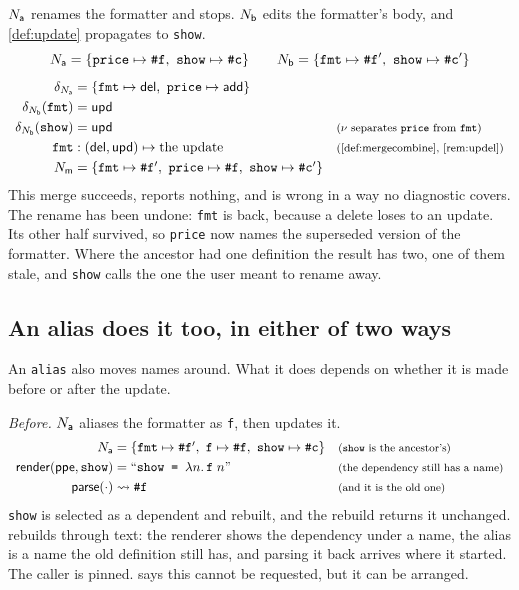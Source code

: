\documentclass[11pt]{article}
\theoremstyle{definition}
\theoremstyle{plain}
\theoremstyle{remark}
\begin{document}
$N_{\mathsf{a}}$ renames the formatter and stops. $N_{\mathsf{b}}$ edits the formatter's body, and \cref{def:update}
propagates to \texttt{show}.
\[
  N_{\mathsf{a}} = \{\texttt{price} \mapsto \texttt{\#f},\ \texttt{show} \mapsto \texttt{\#c}\}
  \qquad
  N_{\mathsf{b}} = \{\texttt{fmt} \mapsto \texttt{\#f}',\ \texttt{show} \mapsto \texttt{\#c}'\}
\]
\[
\begin{array}{r@{\;}l@{\quad}l}
  \delta_{\NA} &= \{\texttt{fmt} \mapsto \ddel,\ \texttt{price} \mapsto \dadd\} & \\[3pt]
  \delta_{\NB}(\texttt{fmt}) &= \dupd & \\[3pt]
  \delta_{\NB}(\texttt{show}) &= \dupd
    & \just{$\namer$ separates \texttt{price} from \texttt{fmt}} \\[3pt]
  \texttt{fmt} &: (\ddel, \dupd) \mapsto \text{the update}
    & \just{\cref{def:mergecombine}, \cref{rem:updel}} \\[3pt]
  \NM &= \{\texttt{fmt} \mapsto \texttt{\#f}',\
            \texttt{price} \mapsto \texttt{\#f},\
            \texttt{show} \mapsto \texttt{\#c}'\} &
\end{array}
\]
This merge succeeds, reports nothing, and is wrong in a way no diagnostic covers. The rename has been
undone: \texttt{fmt} is back, because a delete loses to an update. Its other half survived, so
\texttt{price} now names the superseded version of the formatter. Where the ancestor had one
definition the result has two, one of them stale, and \texttt{show} calls the one the user meant to
rename away.

\subsection{An alias does it too, in either of two ways}\label{ex:merge-alias}

An \texttt{alias} also moves names around. What it does depends on whether it is made before or after
the update.

\emph{Before.} $N_{\mathsf{a}}$ aliases the formatter as \texttt{f}, then updates it.
\[
\begin{array}{r@{\;}l@{\quad}l}
  \NA &= \{\texttt{fmt} \mapsto \texttt{\#f}',\ \texttt{f} \mapsto \texttt{\#f},\
            \texttt{show} \mapsto \texttt{\#c}\}
    & \just{\texttt{show} is the ancestor's} \\[3pt]
  \render(\ppe, \texttt{show}) &= ``\texttt{show = }\ulam{n}{\uapp{\uvar{\texttt{f}}}{\uvar n}}\text{''}
    & \just{the dependency still has a name} \\[3pt]
  \uparse(\cdot) &\rightsquigarrow \uref{\texttt{\#f}}
    & \just{and it is the old one}
\end{array}
\]
\texttt{show} is selected as a dependent and rebuilt, and the rebuild returns it unchanged.
 rebuilds through text: the renderer shows the dependency under a name, the alias is
a name the old definition still has, and parsing it back arrives where it started. The caller is
pinned. \Cref{prop:follow-only} says this cannot be requested, but it can be arranged.
\end{document}

